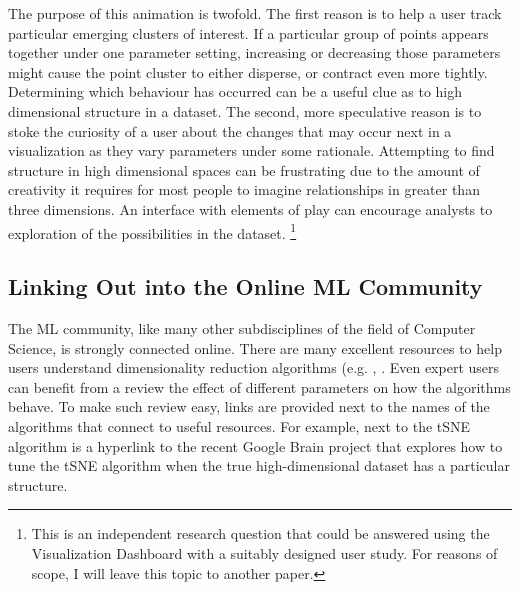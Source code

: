 \documentclass{sigchi}
\begin{document}
The purpose of this animation is twofold. %
%
The first reason is to help a user track particular emerging clusters of interest. %
%
If a particular group of points appears together under one parameter setting, increasing or decreasing those parameters might cause the point cluster to either disperse, or contract even more tightly. %
%
Determining which behaviour has occurred can be a useful clue as to high dimensional structure in a dataset. %
%
The second, more speculative reason is to stoke the curiosity of a user about the changes that may occur next in a visualization as they vary parameters under some rationale. %
%
Attempting to find structure in high dimensional spaces can be frustrating due to the amount of creativity it requires for most people to imagine relationships in greater than three dimensions.
%
An interface with elements of play can encourage analysts to exploration of the possibilities in the dataset.%
%
\footnote{This is an independent research question that could be answered using the Visualization Dashboard with a suitably designed user study. For reasons of scope, I will leave this topic to another paper.} %
%
%
\subsection{Linking Out into the Online ML Community}
%
%
The ML community, like many other subdisciplines of the field of Computer Science, is strongly connected online. %
%
There are many excellent resources to help users understand dimensionality reduction algorithms (e.g. \cite{wattenberg2016how}, \cite{setosaPCA}. %
%
Even expert users can benefit from a review the effect of different parameters on how the algorithms behave. %
%
To make such review easy, links are provided next to the names of the algorithms that connect to useful resources. %
%
For example, next to the tSNE algorithm is a hyperlink to the recent Google Brain project \cite{wattenberg2016how} that explores how to tune the tSNE algorithm when the true high-dimensional dataset has a particular structure. %
%
\end{document}
